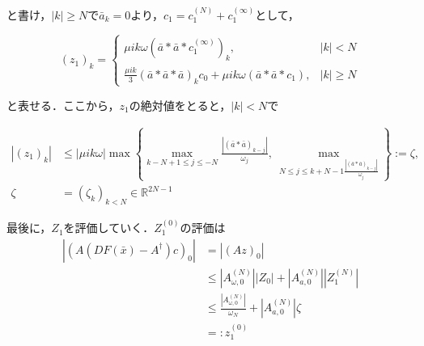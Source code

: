 \documentclass[11pt,a4paper,titlepage]{jsreport}
\theoremstyle{definition}
\begin{document}
と書け，$|k| \geq N で \bar{a}_k = 0$より，$c_1 = c_1^{(N)} + c_1^{(\infty)}$として，

\begin{equation*}
  (z_1)_k = \begin{cases}
    \mu i k \omega \left( \bar{a} * \bar{a} * c_1^{(\infty)} \right)_k, & |k|<N\\
    \frac{\mu i k}{3} \left( \bar{a} * \bar{a} * \bar{a} \right)_k c_0 + \mu i k \omega \left( \bar{a} * \bar{a} * c_1 \right),   & |k|\geq N
  \end{cases}
\end{equation*}

と表せる．ここから，$z_1$の絶対値をとると，$|k|<N$で

\begin{align*}
  |(z_1)_k| & \leq |\mu ik \omega| \max \left\{ \max_{k-N+1\leq j \leq -N} \frac{|\left( \bar{a} * \bar{a} \right)_{k-j}|}{\omega_j} ,\ \max_{N \leq j \leq k+N-1 \frac{|\left( \bar{a} * \bar{a}\right)_{k-j} |}{\omega_j}} \right\} := \zeta, \\
  \zeta     & = (\zeta_k)_{k < N} \in \mathbb{R}^{2N-1}
\end{align*}

最後に，$Z_1$を評価していく．$Z_1^{(0)}$の評価は
\begin{align*}
  |(A(DF(\bar{x})-A^\dagger)c)_0| & = |(Az)_0|                                                                                                \\
                                  & \leq \left|A_{\omega,0}^{(N)}\right| \left|Z_0\right| + \left|A_{a,0}^{(N)}\right| \left|Z_1^{(N)}\right| \\
                                  & \leq \frac{|A_{\omega, 0}^{(N)}|}{\omega_N} + \left|A_{a,0}^{(N)}\right| \zeta                            \\
                                  & =: z_1^{(0)}
\end{align*}
\end{document}
